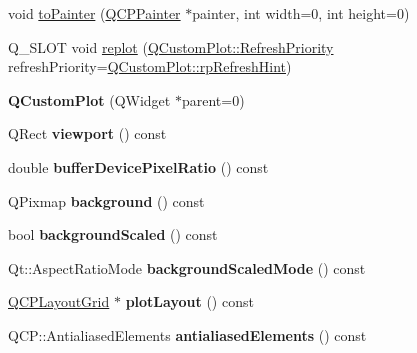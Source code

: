 \begin{DoxyCompactItemize}
\item 
void \hyperlink{class_q_custom_plot_a1be68d5c0f1e086d6374d1340a193fb9}{to\+Painter} (\hyperlink{class_q_c_p_painter}{Q\+C\+P\+Painter} $\ast$painter, int width=0, int height=0)
\item 
Q\+\_\+\+S\+L\+OT void \hyperlink{class_q_custom_plot_aa4bfe7d70dbe67e81d877819b75ab9af}{replot} (\hyperlink{class_q_custom_plot_a45d61392d13042e712a956d27762aa39}{Q\+Custom\+Plot\+::\+Refresh\+Priority} refresh\+Priority=\hyperlink{class_q_custom_plot_a45d61392d13042e712a956d27762aa39a5349b4ed6366760e34653bc54613a5ad}{Q\+Custom\+Plot\+::rp\+Refresh\+Hint})
\item 
\mbox{\label{class_q_custom_plot_a45b99626558651a6428b83972b0b34b8}} 
{\bfseries Q\+Custom\+Plot} (Q\+Widget $\ast$parent=0)
\item 
\mbox{\label{class_q_custom_plot_a19842409b18f556b256d05e97fffc670}} 
Q\+Rect {\bfseries viewport} () const
\item 
\mbox{\label{class_q_custom_plot_a53d35abe0f576f9838cde5d0bee47657}} 
double {\bfseries buffer\+Device\+Pixel\+Ratio} () const
\item 
\mbox{\label{class_q_custom_plot_a5b9bbc838cb856e31b39c050fad49f9a}} 
Q\+Pixmap {\bfseries background} () const
\item 
\mbox{\label{class_q_custom_plot_aac96f3a0f5070228ed13602976886b80}} 
bool {\bfseries background\+Scaled} () const
\item 
\mbox{\label{class_q_custom_plot_af8f1ebfdbf48d7c49f95136475d55b14}} 
Qt\+::\+Aspect\+Ratio\+Mode {\bfseries background\+Scaled\+Mode} () const
\item 
\mbox{\label{class_q_custom_plot_a88882d7546d0343ee8577fb4db0fa1af}} 
\hyperlink{class_q_c_p_layout_grid}{Q\+C\+P\+Layout\+Grid} $\ast$ {\bfseries plot\+Layout} () const
\item 
\mbox{\label{class_q_custom_plot_a631762eb183aceecee73d30e108641ee}} 
Q\+C\+P\+::\+Antialiased\+Elements {\bfseries antialiased\+Elements} () const
\item 

\end{DoxyCompactItemize}
